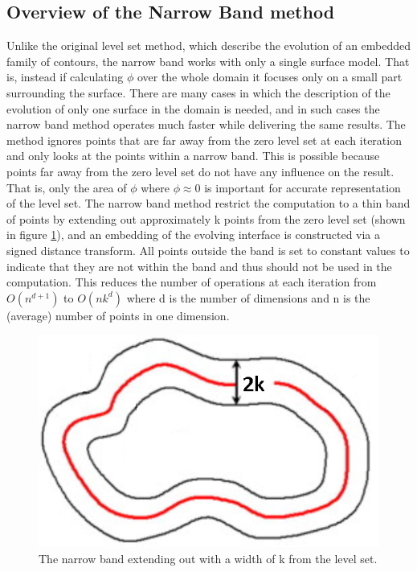 \subsection{Overview of the Narrow Band method}
Unlike the original level set method, which describe the evolution of an embedded family of contours, the narrow band works with only a single surface model\cite{whitaker89}. That is, instead if calculating $\phi$ over the whole domain it focuses only on a small part surrounding the surface. There are many cases in which the description of the evolution of only one surface in the domain is needed, and in such cases the narrow band method operates much faster while delivering the same results. The method ignores points that are far away from the zero level set at each iteration and only looks at the points within a narrow band. This is possible because points far away from the zero level set do not have any influence on the result. That is, only the area of $\phi$ where \(\phi \approx 0\) is important for accurate representation of the level set. The narrow band method restrict the computation to a thin band of points by extending out approximately k points from the zero level set (shown in figure \ref{narrowBand}), and an embedding of the evolving interface is constructed via a signed distance transform. All points outside the band is set to constant values to indicate that they are not within the band and thus should not be used in the computation. This reduces the number of operations at each iteration from \(O(n^{d+1})\) to \(O(nk^{d})\) \cite{adalsteinsson94} where d is the number of dimensions and n is the (average) number of points in one dimension. 
\begin{figure}[h!]
\centering
\includegraphics[width=.5\textwidth]{backgroundTheory/levelset/narrowBand}
\caption{The narrow band extending out with a width of k from the level set.}
\label{narrowBand}
\end{figure}
